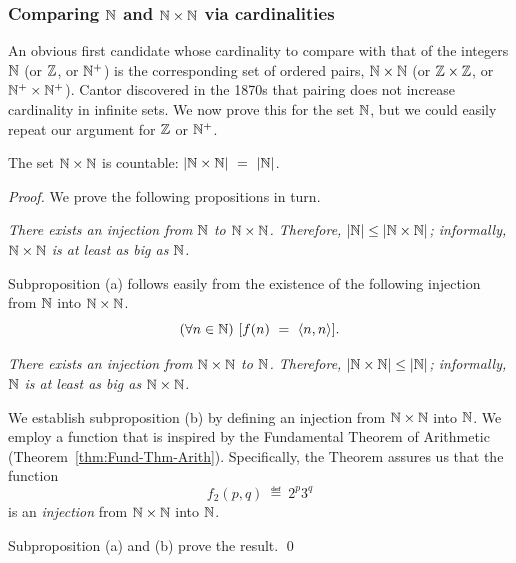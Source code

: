 \subsubsection{Comparing $\mathbb{N}$ and $\mathbb{N} \times \mathbb{N}$ via cardinalities}
\label{sec:compare-NxN-N-via-card}

An obvious first candidate whose cardinality to compare with that of
the integers $\mathbb{N}$ (or $\mathbb{Z}$, or $\mathbb{N}^+$) is the corresponding set of
ordered pairs, $\mathbb{N} \times \mathbb{N}$ (or $\mathbb{Z} \times \mathbb{Z}$, or $\mathbb{N}^+ \times
\mathbb{N}^+$).  Cantor discovered in the 1870s that pairing does not increase
cardinality in infinite sets.  We now prove this for the set $\mathbb{N}$, but
we could easily repeat our argument for $\mathbb{Z}$ or $\mathbb{N}^+$.

\begin{prop}
\label{thm:|NxN|=|N|}
The set $\mathbb{N} \times \mathbb{N}$ is countable:
$|\mathbb{N} \times \mathbb{N}| \ = \ |\mathbb{N}|$.
\end{prop}



\begin{proof}
We prove the following propositions in turn.

\medskip

 {\em There exists an injection from $\mathbb{N}$ to $\mathbb{N}
  \times \mathbb{N}$.  Therefore, $|\mathbb{N}| \leq |\mathbb{N} \times \mathbb{N}|$; informally, $\mathbb{N}
  \times \mathbb{N}$ is at least as big as $\mathbb{N}$.}

\smallskip

\noindent
Subproposition (a) follows easily from the existence of the following
injection from $\mathbb{N}$ into $\mathbb{N} \times \mathbb{N}$.
\[ (\forall n \in \mathbb{N}) \ [ f(n) \ = \ \langle n,n \rangle]. \]

\medskip

 {\em There exists an injection from $\mathbb{N} \times \mathbb{N}$
  to $\mathbb{N}$.  Therefore, $|\mathbb{N} \times \mathbb{N}| \leq |\mathbb{N}|$; informally, $\mathbb{N}$ is
  at least as big as $\mathbb{N} \times \mathbb{N}$.}

\smallskip

\noindent
We establish subproposition (b) by defining an injection from $\mathbb{N}
\times \mathbb{N}$ into $\mathbb{N}$.  We employ a function that is inspired by the
Fundamental Theorem of Arithmetic (Theorem~\ref{thm:Fund-Thm-Arith}).
Specifically, the Theorem assures us that the function
\[ f_2(p,q) \ \eqdef \ 2^p 3^q \]
is an {\em injection} from $\mathbb{N} \times \mathbb{N}$ into $\mathbb{N}$.

Subproposition (a) and (b) prove the result.  \qed
\end{proof}

